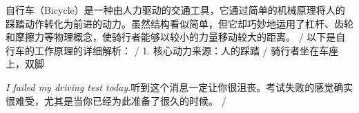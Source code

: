 \begin{multicols}{2}
自\allowbreak{}行\allowbreak{}车\allowbreak{}（\allowbreak{}Bicycl\allowbreak{}e）\allowbreak{}是\allowbreak{}一\allowbreak{}种\allowbreak{}由\allowbreak{}人\allowbreak{}力\allowbreak{}驱\allowbreak{}动\allowbreak{}\allowbreak{}的\allowbreak{}交\allowbreak{}通\allowbreak{}工\allowbreak{}具\allowbreak{}，\allowbreak{}它\allowbreak{}通\allowbreak{}过\allowbreak{}简\allowbreak{}\allowbreak{}单\allowbreak{}的\allowbreak{}机\allowbreak{}械\allowbreak{}原\allowbreak{}理\allowbreak{}将\allowbreak{}人\allowbreak{}的\allowbreak{}踩\allowbreak{}\allowbreak{}踏\allowbreak{}动\allowbreak{}作\allowbreak{}转\allowbreak{}化\allowbreak{}为\allowbreak{}前\allowbreak{}进\allowbreak{}的\allowbreak{}动\allowbreak{}\allowbreak{}力\allowbreak{}。\allowbreak{}虽\allowbreak{}然\allowbreak{}结\allowbreak{}构\allowbreak{}看\allowbreak{}似\allowbreak{}简\allowbreak{}单\allowbreak{}\allowbreak{}，\allowbreak{}但\allowbreak{}它\allowbreak{}却\allowbreak{}巧\allowbreak{}妙\allowbreak{}地\allowbreak{}运\allowbreak{}用\allowbreak{}了\allowbreak{}\allowbreak{}杠\allowbreak{}杆\allowbreak{}、\allowbreak{}齿\allowbreak{}轮\allowbreak{}和\allowbreak{}摩\allowbreak{}擦\allowbreak{}力\allowbreak{}等\allowbreak{}\allowbreak{}物\allowbreak{}理\allowbreak{}概\allowbreak{}念\allowbreak{}，\allowbreak{}使\allowbreak{}骑\allowbreak{}行\allowbreak{}者\allowbreak{}能\allowbreak{}\allowbreak{}够\allowbreak{}以\allowbreak{}较\allowbreak{}小\allowbreak{}的\allowbreak{}力\allowbreak{}量\allowbreak{}移\allowbreak{}动\allowbreak{}较\allowbreak{}\allowbreak{}大\allowbreak{}的\allowbreak{}距\allowbreak{}离\allowbreak{}。\allowbreak{} / 以\allowbreak{}下\allowbreak{}是\allowbreak{}自\allowbreak{}行\allowbreak{}车\allowbreak{}的\allowbreak{}工\allowbreak{}作\allowbreak{}原\allowbreak{}理\allowbreak{}的\allowbreak{}详\allowbreak{}细\allowbreak{}解\allowbreak{}析\allowbreak{}：\allowbreak{} / 1. 核\allowbreak{}心\allowbreak{}动\allowbreak{}力\allowbreak{}来\allowbreak{}源\allowbreak{}：\allowbreak{}人\allowbreak{}的\allowbreak{}踩\allowbreak{}踏\allowbreak{} / 骑\allowbreak{}行\allowbreak{}者\allowbreak{}坐\allowbreak{}在\allowbreak{}车\allowbreak{}座\allowbreak{}上\allowbreak{}，\allowbreak{}双\allowbreak{}脚\allowbreak{}\par\noindent\textit{I failed my driving test today.}\enspace 听\allowbreak{}到\allowbreak{}这\allowbreak{}个\allowbreak{}消\allowbreak{}息\allowbreak{}一\allowbreak{}定\allowbreak{}让\allowbreak{}你\allowbreak{}\allowbreak{}很\allowbreak{}沮\allowbreak{}丧\allowbreak{}。\allowbreak{}考\allowbreak{}试\allowbreak{}失\allowbreak{}败\allowbreak{}的\allowbreak{}感\allowbreak{}\allowbreak{}觉\allowbreak{}确\allowbreak{}实\allowbreak{}很\allowbreak{}难\allowbreak{}受\allowbreak{}，\allowbreak{}尤\allowbreak{}其\allowbreak{}是\allowbreak{}\allowbreak{}当\allowbreak{}你\allowbreak{}已\allowbreak{}经\allowbreak{}为\allowbreak{}此\allowbreak{}准\allowbreak{}备\allowbreak{}了\allowbreak{}很\allowbreak{}\allowbreak{}久\allowbreak{}的\allowbreak{}时\allowbreak{}候\allowbreak{}。\allowbreak{} / 
\end{multicols}
